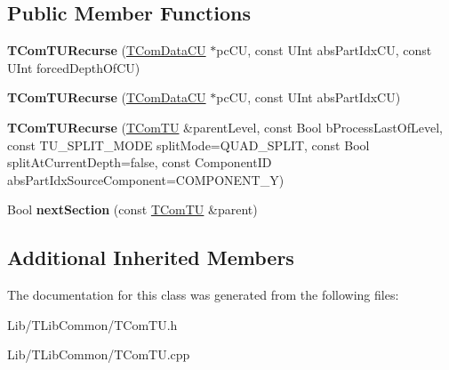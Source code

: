 \subsection*{Public Member Functions}
\begin{DoxyCompactItemize}
\item 
\mbox{\label{class_t_com_t_u_recurse_a9ddc94289b260429ccd3db62284ecb42}} 
{\bfseries T\+Com\+T\+U\+Recurse} (\hyperlink{class_t_com_data_c_u}{T\+Com\+Data\+CU} $\ast$pc\+CU, const U\+Int abs\+Part\+Idx\+CU, const U\+Int forced\+Depth\+Of\+CU)
\item 
\mbox{\label{class_t_com_t_u_recurse_a55f078d7d487fdeb5e5256b87fdfc0e0}} 
{\bfseries T\+Com\+T\+U\+Recurse} (\hyperlink{class_t_com_data_c_u}{T\+Com\+Data\+CU} $\ast$pc\+CU, const U\+Int abs\+Part\+Idx\+CU)
\item 
\mbox{\label{class_t_com_t_u_recurse_ae5df3d36e3955f779d9de606377a5376}} 
{\bfseries T\+Com\+T\+U\+Recurse} (\hyperlink{class_t_com_t_u}{T\+Com\+TU} \&parent\+Level, const Bool b\+Process\+Last\+Of\+Level, const T\+U\+\_\+\+S\+P\+L\+I\+T\+\_\+\+M\+O\+DE split\+Mode=Q\+U\+A\+D\+\_\+\+S\+P\+L\+IT, const Bool split\+At\+Current\+Depth=false, const Component\+ID abs\+Part\+Idx\+Source\+Component=C\+O\+M\+P\+O\+N\+E\+N\+T\+\_\+Y)
\item 
\mbox{\label{class_t_com_t_u_recurse_a443c637b0d490665c62d5147b8440e69}} 
Bool {\bfseries next\+Section} (const \hyperlink{class_t_com_t_u}{T\+Com\+TU} \&parent)
\end{DoxyCompactItemize}
\subsection*{Additional Inherited Members}


The documentation for this class was generated from the following files\+:\begin{DoxyCompactItemize}
\item 
Lib/\+T\+Lib\+Common/T\+Com\+T\+U.\+h\item 
Lib/\+T\+Lib\+Common/T\+Com\+T\+U.\+cpp\end{DoxyCompactItemize}
